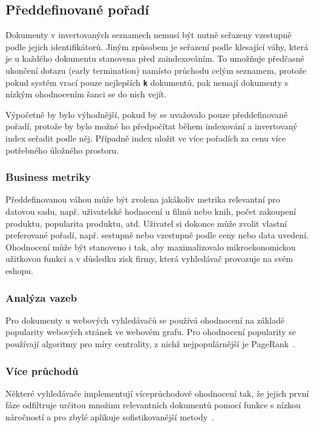 \documentclass[11pt,letterpaper,oneside,openright]{book}
\newcommand{\bftt}[1]{\texttt{\textbf{#1}}}
\begin{document}
\subsection{Předdefinované pořadí}
Dokumenty v invertovaných seznamech nemusí být nutně seřazeny vzestupně podle
jejich identifikátorů. Jiným způsobem je seřazení podle klesající váhy, která
je u každého dokumentu stanovena před zaindexováním. To umožňuje předčasné
ukončení dotazu (early termination) namísto průchodu celým seznamem, protože
pokud systém vrací pouze nejlepších \bftt{k} dokumentů, pak nemají dokumenty s
nízkým ohodnocením šanci se do nich vejít.

Výpočetně by bylo výhodnější, pokud by se uvažovalo pouze předdefinované
pořadí, protože by bylo možné ho předpočítat během indexování a invertovaný
index seřadit podle něj. Případně index uložit ve více pořadích za cenu více
potřebného úložného prostoru.

\subsubsection{Business metriky}
Předdefinovanou váhou může být zvolena jakákoliv metrika relevantní pro datovou
sadu, např. uživatelské hodnocení u filmů nebo knih, počet zakoupení produktu,
popularita produktu, atd. Uživatel si dokonce může zvolit vlastní preferované
pořadí, např. sestupně nebo vzestupně podle ceny nebo data uvedení. Ohodnocení
může být stanoveno i tak, aby maximalizovalo mikroekonomickou užitkovou funkci
a v důsledku zisk firmy, která vyhledávač provozuje na svém eshopu.


\subsubsection{Analýza vazeb}
Pro dokumenty u webových vyhledávačů se používá ohodnocení na základě
popularity webových stránek ve webovém grafu. Pro ohodnocení popularity se
používají algoritmy pro míry centrality, z nichž nejpopulárnější je
PageRank~\cite{Page99thepagerank}.

\subsubsection{Více průchodů}
Některé vyhledávače implementují víceprůchodové ohodnocení tak, že jejich první
fáze odfiltruje určitou množinu relevantních dokumentů pomocí funkce s nízkou
náročností a pro zbylé aplikuje sofistikovanější
metody~\cite{Yin:2016:RRY:2939672.2939677}.
\end{document}
